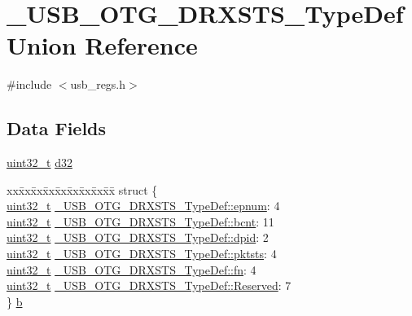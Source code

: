 \hypertarget{union___u_s_b___o_t_g___d_r_x_s_t_s___type_def}{\section{\-\_\-\-U\-S\-B\-\_\-\-O\-T\-G\-\_\-\-D\-R\-X\-S\-T\-S\-\_\-\-Type\-Def Union Reference}
\label{union___u_s_b___o_t_g___d_r_x_s_t_s___type_def}
}


{\ttfamily \#include $<$usb\-\_\-regs.\-h$>$}

\subsection*{Data Fields}
\begin{DoxyCompactItemize}
\item 
\hyperlink{stdint_8h_a435d1572bf3f880d55459d9805097f62}{uint32\-\_\-t} \hyperlink{group___u_s_b___o_t_g___d_r_i_v_e_r_gaea4bd787e51cf95a95ed7f5b8683b2f9}{d32}
\item 
\begin{tabbing}
xx\=xx\=xx\=xx\=xx\=xx\=xx\=xx\=xx\=\kill
struct \{\\
\>\hyperlink{stdint_8h_a435d1572bf3f880d55459d9805097f62}{uint32\_t} \hyperlink{group___u_s_b___o_t_g___d_r_i_v_e_r_ga2f07aa5421872ec08403ee007de2a243}{\_USB\_OTG\_DRXSTS\_TypeDef::epnum}: 4\\
\>\hyperlink{stdint_8h_a435d1572bf3f880d55459d9805097f62}{uint32\_t} \hyperlink{group___u_s_b___o_t_g___d_r_i_v_e_r_ga5d9116a3a8b6fbe994ca0fef4ea1fc07}{\_USB\_OTG\_DRXSTS\_TypeDef::bcnt}: 11\\
\>\hyperlink{stdint_8h_a435d1572bf3f880d55459d9805097f62}{uint32\_t} \hyperlink{group___u_s_b___o_t_g___d_r_i_v_e_r_gab6a62e50cc115337d81dd3a86bc9ce56}{\_USB\_OTG\_DRXSTS\_TypeDef::dpid}: 2\\
\>\hyperlink{stdint_8h_a435d1572bf3f880d55459d9805097f62}{uint32\_t} \hyperlink{group___u_s_b___o_t_g___d_r_i_v_e_r_gaa545e32b80f0074a447ba35d16914bee}{\_USB\_OTG\_DRXSTS\_TypeDef::pktsts}: 4\\
\>\hyperlink{stdint_8h_a435d1572bf3f880d55459d9805097f62}{uint32\_t} \hyperlink{group___u_s_b___o_t_g___d_r_i_v_e_r_gaa2fb877c0502a6b53de02b06aacafaa8}{\_USB\_OTG\_DRXSTS\_TypeDef::fn}: 4\\
\>\hyperlink{stdint_8h_a435d1572bf3f880d55459d9805097f62}{uint32\_t} \hyperlink{group___u_s_b___o_t_g___d_r_i_v_e_r_ga2822869911f2d6f53098a72f710dc2f6}{\_USB\_OTG\_DRXSTS\_TypeDef::Reserved}: 7\\
\} \hyperlink{group___u_s_b___o_t_g___d_r_i_v_e_r_ga9c06c52099ace60cb5b54a6427aa70f5}{b}\\

\end{tabbing}\end{DoxyCompactItemize}


